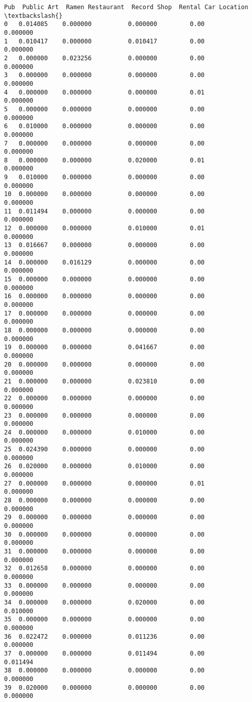 \documentclass[11pt]{article}
\begin{document}
\begin{tcolorbox}[breakable, size=fbox, boxrule=.5pt, pad at break*=1mm, opacityfill=0]
\begin{Verbatim}[commandchars=\\\{\}]
         Pub  Public Art  Ramen Restaurant  Record Shop  Rental Car Location  \textbackslash{}
0   0.014085    0.000000          0.000000         0.00             0.000000
1   0.010417    0.000000          0.010417         0.00             0.000000
2   0.000000    0.023256          0.000000         0.00             0.000000
3   0.000000    0.000000          0.000000         0.00             0.000000
4   0.000000    0.000000          0.000000         0.01             0.000000
5   0.000000    0.000000          0.000000         0.00             0.000000
6   0.010000    0.000000          0.000000         0.00             0.000000
7   0.000000    0.000000          0.000000         0.00             0.000000
8   0.000000    0.000000          0.020000         0.01             0.000000
9   0.010000    0.000000          0.000000         0.00             0.000000
10  0.000000    0.000000          0.000000         0.00             0.000000
11  0.011494    0.000000          0.000000         0.00             0.000000
12  0.000000    0.000000          0.010000         0.01             0.000000
13  0.016667    0.000000          0.000000         0.00             0.000000
14  0.000000    0.016129          0.000000         0.00             0.000000
15  0.000000    0.000000          0.000000         0.00             0.000000
16  0.000000    0.000000          0.000000         0.00             0.000000
17  0.000000    0.000000          0.000000         0.00             0.000000
18  0.000000    0.000000          0.000000         0.00             0.000000
19  0.000000    0.000000          0.041667         0.00             0.000000
20  0.000000    0.000000          0.000000         0.00             0.000000
21  0.000000    0.000000          0.023810         0.00             0.000000
22  0.000000    0.000000          0.000000         0.00             0.000000
23  0.000000    0.000000          0.000000         0.00             0.000000
24  0.000000    0.000000          0.010000         0.00             0.000000
25  0.024390    0.000000          0.000000         0.00             0.000000
26  0.020000    0.000000          0.010000         0.00             0.000000
27  0.000000    0.000000          0.000000         0.01             0.000000
28  0.000000    0.000000          0.000000         0.00             0.000000
29  0.000000    0.000000          0.000000         0.00             0.000000
30  0.000000    0.000000          0.000000         0.00             0.000000
31  0.000000    0.000000          0.000000         0.00             0.000000
32  0.012658    0.000000          0.000000         0.00             0.000000
33  0.000000    0.000000          0.000000         0.00             0.000000
34  0.000000    0.000000          0.020000         0.00             0.010000
35  0.000000    0.000000          0.000000         0.00             0.000000
36  0.022472    0.000000          0.011236         0.00             0.000000
37  0.000000    0.000000          0.011494         0.00             0.011494
38  0.000000    0.000000          0.000000         0.00             0.000000
39  0.020000    0.000000          0.000000         0.00             0.000000


\end{Verbatim}
\end{tcolorbox}
\end{document}
